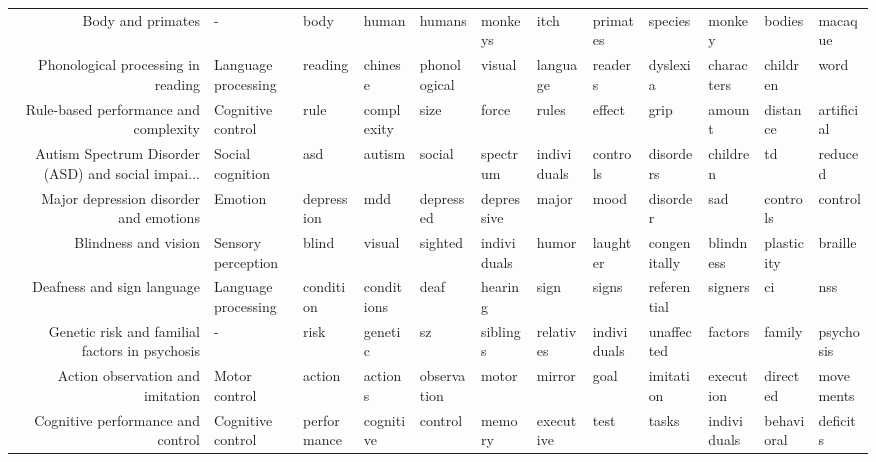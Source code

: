 \begin{tabular}{rlllllllllll}
                                 Body and primates &                   - &             body &         human &          humans &        monkeys &        itch &       primates &       species &         monkey &        bodies &        macaque \\
                Phonological processing in reading & Language processing &          reading &       chinese &    phonological &         visual &    language &        readers &      dyslexia &     characters &      children &           word \\
             Rule-based performance and complexity &   Cognitive control &             rule &    complexity &            size &          force &       rules &         effect &          grip &         amount &      distance &     artificial \\
Autism Spectrum Disorder (ASD) and social impai... &    Social cognition &              asd &        autism &          social &       spectrum & individuals &       controls &     disorders &       children &            td &        reduced \\
            Major depression disorder and emotions &             Emotion &       depression &           mdd &       depressed &     depressive &       major &           mood &      disorder &            sad &      controls &        control \\
                              Blindness and vision &  Sensory perception &            blind &        visual &         sighted &    individuals &       humor &       laughter &  congenitally &      blindness &    plasticity &        braille \\
                        Deafness and sign language & Language processing &        condition &    conditions &            deaf &        hearing &        sign &          signs &   referential &        signers &            ci &            nss \\
    Genetic risk and familial factors in psychosis &                   - &             risk &       genetic &              sz &       siblings &   relatives &    individuals &    unaffected &        factors &        family &      psychosis \\
                  Action observation and imitation &       Motor control &           action &       actions &     observation &          motor &      mirror &           goal &     imitation &      execution &      directed &      movements \\
                 Cognitive performance and control &   Cognitive control &      performance &     cognitive &         control &         memory &   executive &           test &         tasks &    individuals &    behavioral &       deficits \\

\end{tabular}
